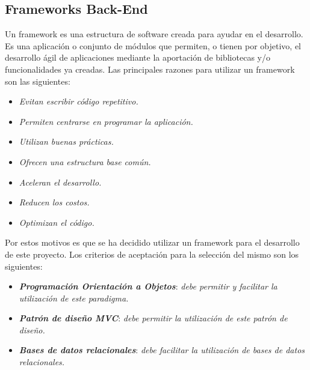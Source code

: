 \documentclass[11pt,oneside]{book}
\begin{document}
\subsection{Frameworks Back-End}
Un framework es una estructura de software creada para ayudar en el desarrollo. Es una aplicación o conjunto de módulos que permiten, o tienen por objetivo, el desarrollo ágil de aplicaciones mediante la aportación de bibliotecas y/o funcionalidades ya creadas. Las principales razones para utilizar un framework son las siguientes:
\begin{itemize}
\item \textit{Evitan escribir código repetitivo.}
\item \textit{Permiten centrarse en programar la aplicación.}
\item \textit{Utilizan buenas prácticas.}
\item \textit{Ofrecen una estructura base común.}
\item \textit{Aceleran el desarrollo.}
\item \textit{Reducen los costos.}
\item \textit{Optimizan el código.}
\end{itemize}

Por estos motivos es que se ha decidido utilizar un framework para el desarrollo de este proyecto. Los criterios de aceptación para la selección del mismo son los siguientes:
\begin{itemize}
\item \textit{\textbf{Programación Orientación a Objetos}}: \textit{debe permitir y facilitar la utilización de este paradigma.}

\item \textit{\textbf{Patrón de diseño MVC}}: \textit{debe permitir la utilización de este patrón de diseño.}

\item \textit{\textbf{Bases de datos relacionales}}: \textit{debe facilitar la utilización de bases de datos relacionales.}
\end{itemize}
\end{document}
